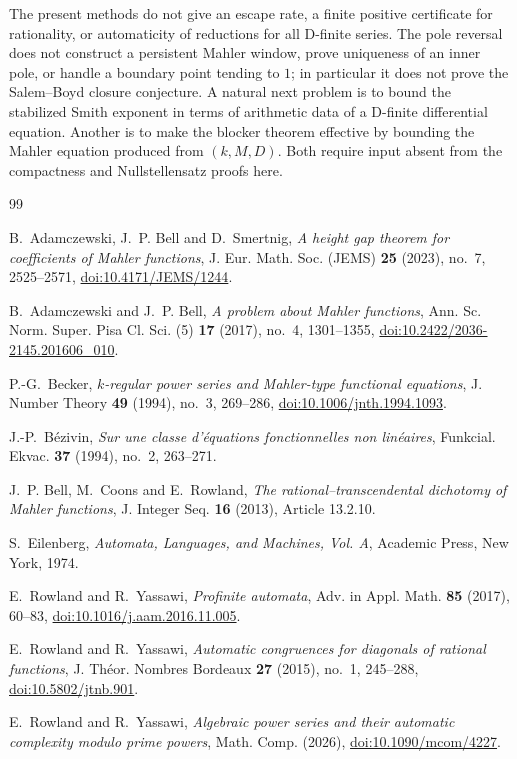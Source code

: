 \documentclass[11pt,reqno]{amsart}
\theoremstyle{definition}
\theoremstyle{remark}
\begin{document}
The present methods do not give an escape rate, a finite positive certificate
for rationality, or automaticity of reductions for all D-finite series.  The
pole reversal does not construct a persistent Mahler window, prove uniqueness
of an inner pole, or handle a boundary point tending to $1$; in particular it
does not prove the Salem--Boyd closure conjecture.  A natural next problem is
to bound the stabilized Smith exponent in terms of arithmetic data of a
D-finite differential equation.  Another is to make the blocker theorem
effective by bounding the Mahler equation produced from $(k,M,D)$.  Both
require input absent from the compactness and Nullstellensatz proofs here.

\enlargethispage{3\baselineskip}
\scriptsize
\begin{thebibliography}{99}

B.~Adamczewski, J.~P. Bell and D.~Smertnig,
\emph{A height gap theorem for coefficients of Mahler functions},
J. Eur. Math. Soc. (JEMS) \textbf{25} (2023), no.~7, 2525--2571,
\href{https://doi.org/10.4171/JEMS/1244}{doi:10.4171/JEMS/1244}.

B.~Adamczewski and J.~P. Bell,
\emph{A problem about Mahler functions},
Ann. Sc. Norm. Super. Pisa Cl. Sci. (5) \textbf{17} (2017), no.~4,
1301--1355,
\href{https://doi.org/10.2422/2036-2145.201606_010}{doi:10.2422/2036-2145.201606\_010}.

P.-G.~Becker,
\emph{$k$-regular power series and Mahler-type functional equations},
J. Number Theory \textbf{49} (1994), no.~3, 269--286,
\href{https://doi.org/10.1006/jnth.1994.1093}{doi:10.1006/jnth.1994.1093}.

J.-P.~B\'ezivin,
\emph{Sur une classe d'\'equations fonctionnelles non lin\'eaires},
Funkcial. Ekvac. \textbf{37} (1994), no.~2, 263--271.

J.~P. Bell, M.~Coons and E.~Rowland,
\emph{The rational--transcendental dichotomy of Mahler functions},
J. Integer Seq. \textbf{16} (2013), Article 13.2.10.

S.~Eilenberg,
\emph{Automata, Languages, and Machines, Vol. A},
Academic Press, New York, 1974.

E.~Rowland and R.~Yassawi,
\emph{Profinite automata},
Adv. in Appl. Math. \textbf{85} (2017), 60--83,
\href{https://doi.org/10.1016/j.aam.2016.11.005}{doi:10.1016/j.aam.2016.11.005}.

E.~Rowland and R.~Yassawi,
\emph{Automatic congruences for diagonals of rational functions},
J. Th\'eor. Nombres Bordeaux \textbf{27} (2015), no.~1, 245--288,
\href{https://doi.org/10.5802/jtnb.901}{doi:10.5802/jtnb.901}.

E.~Rowland and R.~Yassawi,
\emph{Algebraic power series and their automatic complexity modulo prime
powers}, Math. Comp. (2026),
\href{https://doi.org/10.1090/mcom/4227}{doi:10.1090/mcom/4227}.

\end{thebibliography}
\end{document}
